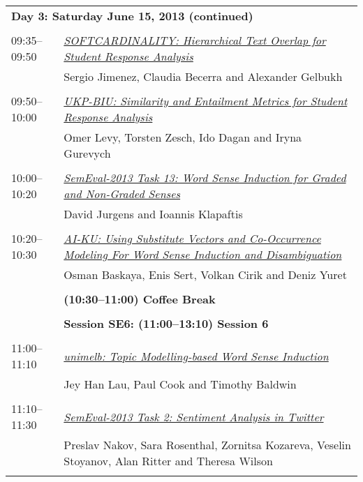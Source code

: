 \begin{tabular}{p{20mm}p{138mm}}
\\
\multicolumn{2}{l}{\bf Day 3: Saturday June 15, 2013 (continued)} \\\\
09:35--09:50 & \hyperlink{page.280}{\em SOFTCARDINALITY: Hierarchical Text Overlap for Student Response Analysis}\\
         & Sergio Jimenez, Claudia Becerra and Alexander Gelbukh \\
\\

09:50--10:00 & \hyperlink{page.285}{\em UKP-BIU: Similarity and Entailment Metrics for Student Response Analysis}\\
         & Omer Levy, Torsten Zesch, Ido Dagan and Iryna Gurevych \\
\\

10:00--10:20 & \hyperlink{page.290}{\em SemEval-2013 Task 13: Word Sense Induction for Graded and Non-Graded Senses}\\
         & David Jurgens and Ioannis Klapaftis \\
\\

10:20--10:30 & \hyperlink{page.300}{\em AI-KU: Using Substitute Vectors and Co-Occurrence Modeling For Word Sense Induction and Disambiguation}\\
         & Osman Baskaya, Enis Sert, Volkan Cirik and Deniz Yuret \\
\\

 & {\bf (10:30--11:00) Coffee Break} \\
\\
 & {\bf Session SE6: (11:00--13:10) Session 6} \\
\\
11:00--11:10 & \hyperlink{page.307}{\em unimelb: Topic Modelling-based Word Sense Induction}\\
         & Jey Han Lau, Paul Cook and Timothy Baldwin \\
\\

11:10--11:30 & \hyperlink{page.312}{\em SemEval-2013 Task 2: Sentiment Analysis in Twitter}\\
         & Preslav Nakov, Sara Rosenthal, Zornitsa Kozareva, Veselin Stoyanov, Alan Ritter and Theresa Wilson \\
\\


\end{tabular}
